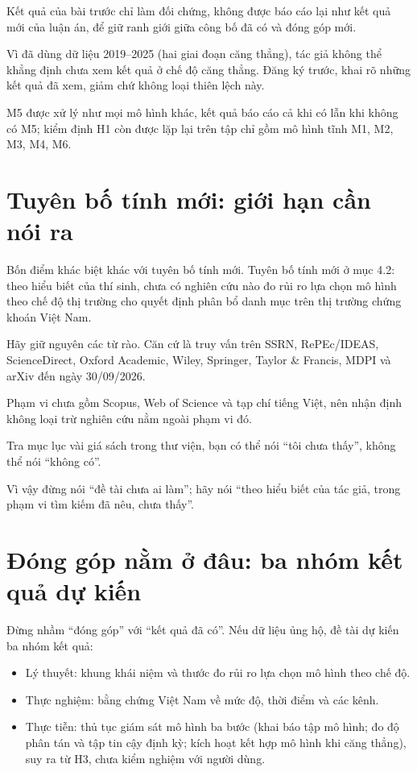 Kết quả của bài trước chỉ làm đối chứng, không được báo cáo lại như kết quả mới của luận án, để giữ ranh giới giữa công bố đã có và đóng góp mới.

Vì đã dùng dữ liệu 2019--2025 (hai giai đoạn căng thẳng), tác giả không thể khẳng định chưa xem kết quả ở chế độ căng thẳng. Đăng ký trước, khai rõ những kết quả đã xem, giảm chứ không loại thiên lệch này.

M5 được xử lý như mọi mô hình khác, kết quả báo cáo cả khi có lẫn khi không có M5; kiểm định H1 còn được lặp lại trên tập chỉ gồm mô hình tĩnh M1, M2, M3, M4, M6.

\section{Tuyên bố tính mới: giới hạn cần nói ra}

Bốn điểm khác biệt khác với tuyên bố tính mới. Tuyên bố tính mới ở mục 4.2: theo hiểu biết của thí sinh, chưa có nghiên cứu nào đo rủi ro lựa chọn mô hình theo chế độ thị trường cho quyết định phân bổ danh mục trên thị trường chứng khoán Việt Nam.

Hãy giữ nguyên các từ rào. Căn cứ là truy vấn trên SSRN, RePEc/IDEAS, ScienceDirect, Oxford Academic, Wiley, Springer, Taylor \& Francis, MDPI và arXiv đến ngày 30/09/2026.

Phạm vi chưa gồm Scopus, Web of Science và tạp chí tiếng Việt, nên nhận định không loại trừ nghiên cứu nằm ngoài phạm vi đó.

Tra mục lục vài giá sách trong thư viện, bạn có thể nói “tôi chưa thấy”, không thể nói “không có”.

Vì vậy đừng nói “đề tài chưa ai làm”; hãy nói “theo hiểu biết của tác giả, trong phạm vi tìm kiếm đã nêu, chưa thấy”.

\section{Đóng góp nằm ở đâu: ba nhóm kết quả dự kiến}

Đừng nhầm “đóng góp” với “kết quả đã có”. Nếu dữ liệu ủng hộ, đề tài dự kiến ba nhóm kết quả:

\begin{itemize}
\item
  Lý thuyết: khung khái niệm và thước đo rủi ro lựa chọn mô hình theo chế độ.
\item
  Thực nghiệm: bằng chứng Việt Nam về mức độ, thời điểm và các kênh.
\item
  Thực tiễn: thủ tục giám sát mô hình ba bước (khai báo tập mô hình; đo độ phân tán và tập tin cậy định kỳ; kích hoạt kết hợp mô hình khi căng thẳng), suy ra từ H3, chưa kiểm nghiệm với người dùng.
\end{itemize}

